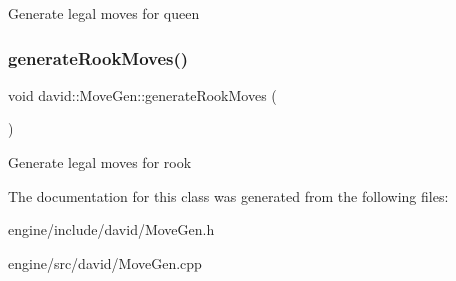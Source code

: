 Generate legal moves for queen \mbox{\label{classdavid_1_1MoveGen_a5658568059a418aa87c6abaec120fa07}} 
\subsubsection{\texorpdfstring{generate\+Rook\+Moves()}{generateRookMoves()}}
{\footnotesize\ttfamily void david\+::\+Move\+Gen\+::generate\+Rook\+Moves (\begin{DoxyParamCaption}{ }\end{DoxyParamCaption})}

Generate legal moves for rook 

The documentation for this class was generated from the following files\+:\begin{DoxyCompactItemize}
\item 
engine/include/david/Move\+Gen.\+h\item 
engine/src/david/Move\+Gen.\+cpp\end{DoxyCompactItemize}
